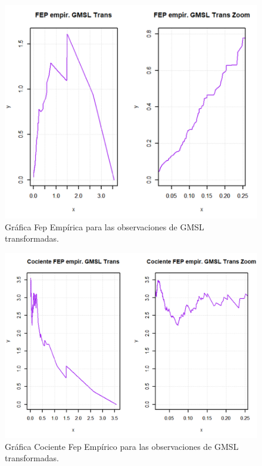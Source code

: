 \documentclass[10.5pt,notitlepage]{article}
\theoremstyle{plain}
\begin{document}
\begin{figure}[htb]
    \centering
    \includegraphics[scale = 0.4]{Incisob/FepGMLSTrans.png}
    \caption{Gráfica Fep Empírica para las observaciones de GMSL transformadas. }
    \label{fig:4}
\end{figure}

\begin{figure}[htb]
    \centering
    \includegraphics[scale = 0.4]{Incisob/CocFepGMLSTrans.png}
    \caption{Gráfica Cociente Fep Empírico para las observaciones de GMSL transformadas. }
    \label{fig:5}
\end{figure}
\end{document}

